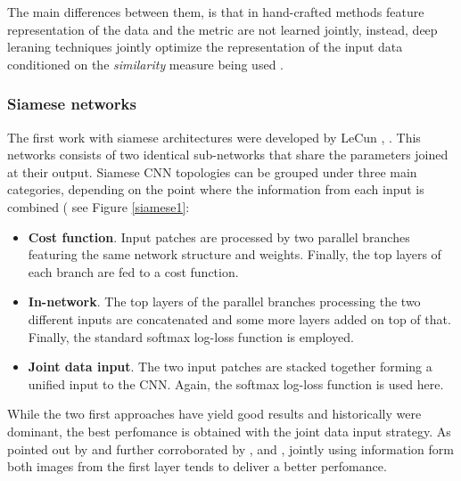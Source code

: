 \documentclass[12pt, a4paper, titlepage,twoside,openright]{article}
\begin{document}
The main differences between them, is that in hand-crafted methods feature representation of the data and the metric are not learned jointly, instead, deep leraning techniques jointly optimize the representation of the input data conditioned on the \textit{similarity} measure being used \cite{EC1}. 





\subsubsection{Siamese networks}


The first work with siamese architectures were developed by LeCun \cite{siamLecun}, \cite{siameLecun2}. This networks consists of two identical sub-networks that share the parameters joined at their output. Siamese CNN topologies can be grouped under three main categories, depending on the point where the information from each input is combined ( see Figure \ref{siamese1}:

\begin{itemize}

\item \textbf{Cost function}. Input patches are processed by two parallel branches featuring the same network structure and weights. Finally, the top layers of each branch are fed to a cost function.

\item \textbf{In-network}. The top layers of the parallel branches processing the two different inputs are concatenated and some more layers added on top of that. Finally, the standard softmax log-loss function is employed.

\item \textbf{Joint data input}. The two input patches are stacked together forming a unified input to the CNN. Again, the softmax log-loss function is used here.

\end{itemize}

While the two first approaches have yield good results and historically were dominant, the best perfomance is obtained with the joint data input strategy. As pointed out by  \cite{patch1} and further corroborated by \cite{patch2}, and \cite{patch3}, jointly using information form both images from the first layer tends to deliver a better perfomance.
\end{document}
